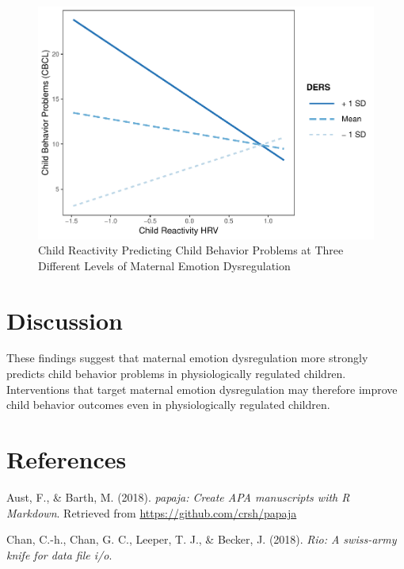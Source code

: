 \documentclass[man]{apa6}
\begin{document}
\begin{figure}
\centering
\includegraphics{DataPrepScript_apa_style_files/figure-latex/plot3-1.pdf}
\caption{\label{fig:plot3}Child Reactivity Predicting Child Behavior
Problems at Three Different Levels of Maternal Emotion Dysregulation}
\end{figure}

\section{Discussion}\label{discussion}

These findings suggest that maternal emotion dysregulation more strongly
predicts child behavior problems in physiologically regulated children.
Interventions that target maternal emotion dysregulation may therefore
improve child behavior outcomes even in physiologically regulated
children.

\newpage

\section{References}\label{references}

\begingroup
\setlength{\parindent}{-0.5in} \setlength{\leftskip}{0.5in}

\hypertarget{refs}{}
\hypertarget{ref-R-papaja}{}
Aust, F., \& Barth, M. (2018). \emph{papaja: Create APA manuscripts with
R Markdown}. Retrieved from \url{https://github.com/crsh/papaja}

\hypertarget{ref-R-rio}{}
Chan, C.-h., Chan, G. C., Leeper, T. J., \& Becker, J. (2018).
\emph{Rio: A swiss-army knife for data file i/o}.
\end{document}
